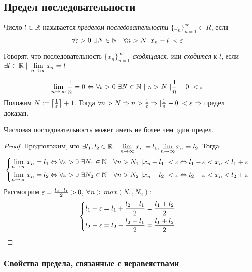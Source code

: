 \subsection{Предел последовательности}

\begin{definition}
    Число $l \in \mathbb{R}$ называется \textit{пределом последовательности} $\{x_n\}_{n = 1}^\infty \subset R$, если
    $$
        \forall \eps > 0\ \exists N \in \N\ |\ \forall n > N\ |x_n - l| < \eps
    $$
\end{definition}

\begin{definition}
    Говорят, что последовательность $\{x_n\}_{n = 1}^\infty$ \textit{сходящаяся}, или \textit{сходится} к $l$, если $\exists l \in \mathbb{R}\ |\ \lim\limits_{n \to \infty} x_n = l$
\end{definition}

\begin{example}
    $$
        \lim\limits_{n \to \infty} \frac{1}{n} = 0 \Leftrightarrow \forall \varepsilon > 0\ \exists N \in \mathbb{N}\ |\ n > N\ |\frac{1}{n} - 0| < \varepsilon
    $$
    Положим $N := \left\lceil\frac{1}{\varepsilon}\right\rceil + 1$. Тогда $\forall n > N \Rightarrow n > \frac{1}{\varepsilon} \Rightarrow |\frac{1}{n} - 0| < \varepsilon \Rightarrow$ предел доказан.
\end{example}

\begin{theorem}
    Числовая последовательность может иметь не более чем один предел.
\end{theorem}

\begin{proof}
    Предположим, что $\exists l_1, l_2 \in \mathbb{R}\ |\ \lim\limits_{n \to \infty} x_n = l_1, \lim\limits_{n \to \infty} x_n = l_2$. Тогда:
    $$
        \left\{\begin{aligned}
        \lim\limits_{n \to \infty} x_n = l_1 \Leftrightarrow \forall \varepsilon > 0\ \exists N_1 \in \mathbb{N}\ |\ \forall n > N_1\ |x_n - l_1| < \varepsilon \Leftrightarrow l_1 - \varepsilon < x_n < l_1 + \varepsilon
        \\
        \lim\limits_{n \to \infty} x_n = l_2 \Leftrightarrow \forall \varepsilon > 0\ \exists N_2 \in \mathbb{N}\ |\ \forall n > N_2\ |x_n - l_2| < \varepsilon \Leftrightarrow l_2 - \varepsilon < x_n < l_2 + \varepsilon
        \end{aligned}\right.
    $$
    Рассмотрим $\varepsilon = \frac{l_2 - l_1}{2} > 0$, $\forall n > max(N_1, N_2)$:
    $$
        \left\{\begin{aligned}
        l_1 + \varepsilon = l_1 + \frac{l_2 - l_1}{2} = \frac{l_1 + l_2}{2}
        \\
        l_2 - \varepsilon = l_2 - \frac{l_2 - l_1}{2} = \frac{l_1 + l_2}{2}
        \end{aligned}\right.
    $$
\end{proof}

\subsubsection*{Свойства предела, связанные с неравенствами}

